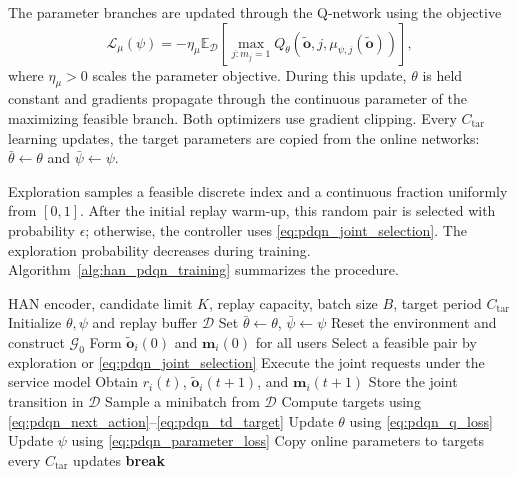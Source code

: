 \documentclass[journal]{IEEEtran}
\begin{document}
The parameter branches are updated through the Q-network
using the objective
\begin{equation}
\mathcal{L}_{\mu}(\psi)
=
-\eta_{\mu}
\mathbb{E}_{\mathcal{D}}
\left[
\max_{j:m_j=1}
Q_\theta\left(
\widetilde{\mathbf{o}},j,
\mu_{\psi,j}(\widetilde{\mathbf{o}})
\right)
\right],
\label{eq:pdqn_parameter_loss}
\end{equation}
where $\eta_{\mu}>0$ scales the parameter objective.
During this update, $\theta$ is held constant and
gradients propagate through the continuous parameter
of the maximizing feasible branch.
Both optimizers use gradient clipping.
Every $C_{\mathrm{tar}}$ learning updates, the target
parameters are copied from the online networks:
$\bar{\theta}\leftarrow\theta$ and
$\bar{\psi}\leftarrow\psi$.

Exploration samples a feasible discrete index and a
continuous fraction uniformly from $[0,1]$.
After the initial replay warm-up, this random pair is
selected with probability $\epsilon$; otherwise, the
controller uses \eqref{eq:pdqn_joint_selection}.
The exploration probability decreases during training.
Algorithm~\ref{alg:han_pdqn_training} summarizes the procedure.

\begin{algorithm}[t]
\caption{HAN--PDQN Training}
\label{alg:han_pdqn_training}
\begin{algorithmic}[1]
\Require HAN encoder, candidate limit $K$, replay capacity,
batch size $B$, target period $C_{\mathrm{tar}}$
\State Initialize $\theta,\psi$ and replay buffer $\mathcal{D}$
\State Set $\bar{\theta}\gets\theta$, $\bar{\psi}\gets\psi$
    \State Reset the environment and construct $\mathcal{G}_0$
    \State Form $\widetilde{\mathbf{o}}_i(0)$ and
    $\mathbf{m}_i(0)$ for all users
            \State Select a feasible pair by exploration or
            \eqref{eq:pdqn_joint_selection}
        \EndFor
        \State Execute the joint requests under the service model
        \State Obtain $r_i(t)$, $\widetilde{\mathbf{o}}_i(t+1)$,
        and $\mathbf{m}_i(t+1)$
        \State Store the joint transition in $\mathcal{D}$
            \State Sample a minibatch from $\mathcal{D}$
            \State Compute targets using
            \eqref{eq:pdqn_next_action}--\eqref{eq:pdqn_td_target}
            \State Update $\theta$ using \eqref{eq:pdqn_q_loss}
            \State Update $\psi$ using \eqref{eq:pdqn_parameter_loss}
            \State Copy online parameters to targets every
            $C_{\mathrm{tar}}$ updates
        \EndIf
            \State \textbf{break}
        \EndIf
    \EndFor
\EndFor
\end{algorithmic}
\end{algorithm}
\end{document}
